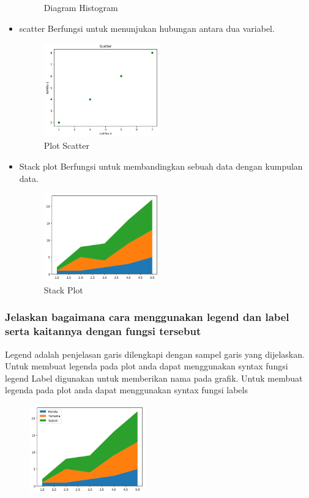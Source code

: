 \begin{itemize}
\begin{figure}[H]
    \centering
    \caption{Diagram Histogram}
\end{figure}
    \item scatter
    Berfungsi untuk  menunjukan hubungan antara dua variabel.
    
\begin{figure}[H]	
    \includegraphics[width=5cm]{figures/6/1174074/Teori/plot_scatter.png}
    \centering
    \caption{Plot Scatter}
\end{figure}
    \item Stack plot
  Berfungsi untuk  membandingkan sebuah data dengan kumpulan data.
    
\begin{figure}[H]	
    \includegraphics[width=5cm]{figures/6/1174074/Teori/stack_plot.png}
    \centering
    \caption{Stack Plot}
\end{figure}
\end{itemize}

\subsubsection{Jelaskan bagaimana cara menggunakan legend dan label serta kaitannya dengan fungsi tersebut}
\hfill \break
Legend adalah penjelasan garis dilengkapi dengan sampel garis yang dijelaskan. Untuk membuat legenda pada plot anda dapat menggunakan syntax fungsi legend
 Label digunakan untuk memberikan nama pada grafik. Untuk membuat legenda pada plot anda dapat menggunakan syntax fungsi labels

\begin{figure}[H]	
    \includegraphics[width=5cm]{figures/6/1174074/Teori/legend_label.png}
    \centering
\end{figure}

